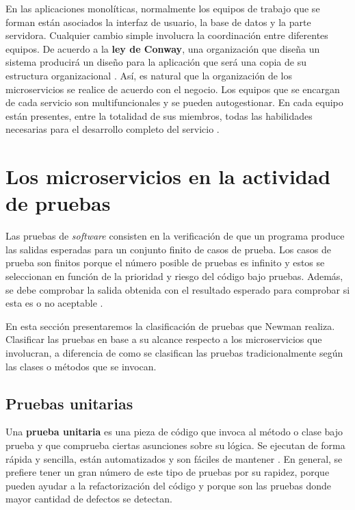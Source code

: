 \documentclass[11pt,spanish,listoffigures]{tfgetsinf}
\begin{document}
En las aplicaciones monolíticas, normalmente los equipos de trabajo que se forman están asociados la interfaz de usuario, la base de datos y la parte servidora. Cualquier cambio simple involucra la coordinación entre diferentes equipos. De acuerdo a la \textbf{ley de Conway}, una organización que diseña un sistema producirá un diseño para la aplicación que será una copia de su estructura organizacional \cite{Conway1968}. Así, es natural que la organización de los microservicios se realice de acuerdo con el negocio. Los equipos que se encargan de cada servicio son multifuncionales y se pueden autogestionar. En cada equipo están presentes, entre la totalidad de sus miembros, todas las habilidades necesarias para el desarrollo completo del servicio \cite{Lewis2014}.

\section{Los microservicios en la actividad de pruebas} \label{sect:FasePruebas}

Las pruebas de \textit{software} consisten en la verificación de que un programa produce las salidas esperadas para un conjunto finito de casos de prueba. Los casos de prueba son finitos porque el número posible de pruebas es infinito y estos se seleccionan en función de la prioridad y riesgo del código bajo pruebas. Además, se debe comprobar la salida obtenida con el resultado esperado para comprobar si esta es o no aceptable \cite{Bourque2014}.

En esta sección presentaremos la clasificación de pruebas que Newman \cite{Newman2015a} realiza. Clasificar las pruebas en base a su alcance respecto a los microservicios que involucran, a diferencia de como se clasifican las pruebas tradicionalmente según las clases o métodos que se invocan.

\subsection{Pruebas unitarias}

Una \textbf{prueba unitaria} es una pieza de código que invoca al método o clase bajo prueba y que comprueba ciertas asunciones sobre su lógica. Se ejecutan de forma rápida y sencilla, están automatizados y son fáciles de mantener \cite{Osherove2014}. En general, se prefiere tener un gran número de este tipo de pruebas por su rapidez, porque pueden ayudar a la refactorización del código y porque son las pruebas donde mayor cantidad de defectos se detectan.
\end{document}
